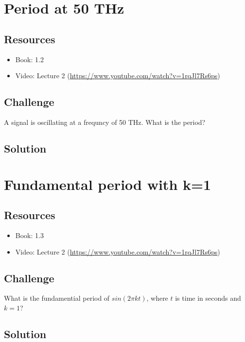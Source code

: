 \section{Period at 50 THz}

\subsection*{Resources}
\begin{itemize}
    \item Book: 1.2
    \item Video: Lecture 2 (\url{https://www.youtube.com/watch?v=1rqJl7Rs6ps})
\end{itemize}

\subsection*{Challenge}
A signal is oscillating at a frequncy of 50 THz.  What is the period?

\subsection*{Solution}





\newpage

\section {Fundamental period with k=1}

\subsection*{Resources}
\begin{itemize}
    \item Book: 1.3
    \item Video: Lecture 2 (\url{https://www.youtube.com/watch?v=1rqJl7Rs6ps})
\end{itemize}

\subsection*{Challenge}
What is the fundamential period of $sin(2 \pi k t)$, where $t$ is time in seconds and $k=1$?

\subsection*{Solution}

